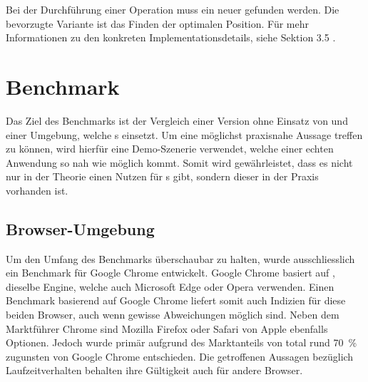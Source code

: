 Bei der Durchführung einer  Operation muss ein neuer  gefunden werden. Die bevorzugte Variante ist das Finden der optimalen Position. Für mehr Informationen zu den konkreten Implementationsdetails, siehe  Sektion 3.5 \cite{quadridBasedSurfaceSimplification}.

\section{Benchmark}

Das Ziel des Benchmarks ist der Vergleich einer Version ohne Einsatz von  und einer Umgebung, welche s einsetzt. Um eine möglichst praxisnahe Aussage treffen zu können, wird hierfür eine Demo-Szenerie verwendet, welche einer echten Anwendung so nah wie möglich kommt. Somit wird gewährleistet, dass es nicht nur in der Theorie einen Nutzen für s gibt, sondern dieser in der Praxis vorhanden ist.

\subsection{Browser-Umgebung}
Um den Umfang des Benchmarks überschaubar zu halten, wurde ausschliesslich ein Benchmark für Google Chrome entwickelt.
Google Chrome basiert auf , dieselbe Engine, welche auch Microsoft Edge oder Opera verwenden.
Einen Benchmark basierend auf Google Chrome liefert somit auch Indizien für diese beiden Browser, auch wenn gewisse Abweichungen möglich sind.
Neben dem Marktführer Chrome sind Mozilla Firefox oder Safari von Apple ebenfalls Optionen. Jedoch wurde primär aufgrund des Marktanteils von total rund 70 \% \cite{browserUsage} zugunsten von Google Chrome entschieden.
Die getroffenen Aussagen bezüglich Laufzeitverhalten behalten ihre Gültigkeit auch für andere Browser.

